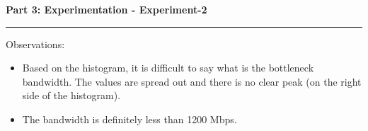 \documentclass[a4paper,12pt]{article}
\newenvironment{solution}[2][]{%
    \begin{mdframed}[linecolor=blue!70!black, linewidth=2pt, roundcorner=10pt, backgroundcolor=yellow!10!white, skipabove=12pt, skipbelow=12pt]%
        \textbf{\large #2}
        \par\noindent\rule{\textwidth}{0.4pt}
}{
    \end{mdframed}
}
\begin{document}
\begin{solution}{Part 3: Experimentation - Experiment-2}
\begin{itemize}
Observations:
\begin{itemize}
    \item Based on the histogram, it is difficult to say what is the bottleneck bandwidth. The values are spread out and there is no clear peak (on the right side of the histogram).
    \item The bandwidth is definitely less than 1200 Mbps.
\end{itemize}   
\end{itemize}

\end{solution}
\end{document}
